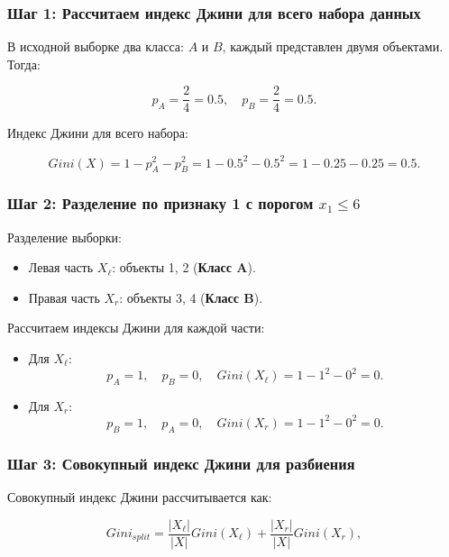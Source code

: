 \begin{solution}
    \subsubsection*{Шаг 1: Рассчитаем индекс Джини для всего набора данных}
    В исходной выборке два класса: $A$ и $B$, каждый представлен двумя объектами. Тогда:
    
    \[
        p_A = \frac{2}{4} = 0.5, \quad p_B = \frac{2}{4} = 0.5.
    \]
    
    Индекс Джини для всего набора:
    
    \[
        Gini(X) = 1 - p_A^2 - p_B^2 = 1 - 0.5^2 - 0.5^2 = 1 - 0.25 - 0.25 = 0.5.
    \]
    
    \subsubsection*{Шаг 2: Разделение по признаку 1 с порогом $x_1 \leq 6$}
    
    Разделение выборки:
    \begin{itemize}
        \item Левая часть $X_\ell$: объекты 1, 2 (\textbf{Класс A}).
        \item Правая часть $X_r$: объекты 3, 4 (\textbf{Класс B}).
    \end{itemize}
    
    \noindent Рассчитаем индексы Джини для каждой части:
    \begin{itemize}
        \item Для $X_\ell$:
              \[
                  p_A = 1, \quad p_B = 0, \quad Gini(X_\ell) = 1 - 1^2 - 0^2 = 0.
              \]
              
        \item Для $X_r$:
              \[
                  p_B = 1, \quad p_A = 0, \quad Gini(X_r) = 1 - 1^2 - 0^2 = 0.
              \]
    \end{itemize}
    
    \subsubsection*{Шаг 3: Совокупный индекс Джини для разбиения}
    
    Совокупный индекс Джини рассчитывается как:
    
    \[
        Gini_{split} = \frac{|X_\ell|}{|X|} Gini(X_\ell) + \frac{|X_r|}{|X|} Gini(X_r),
    \]
    

\end{solution}
